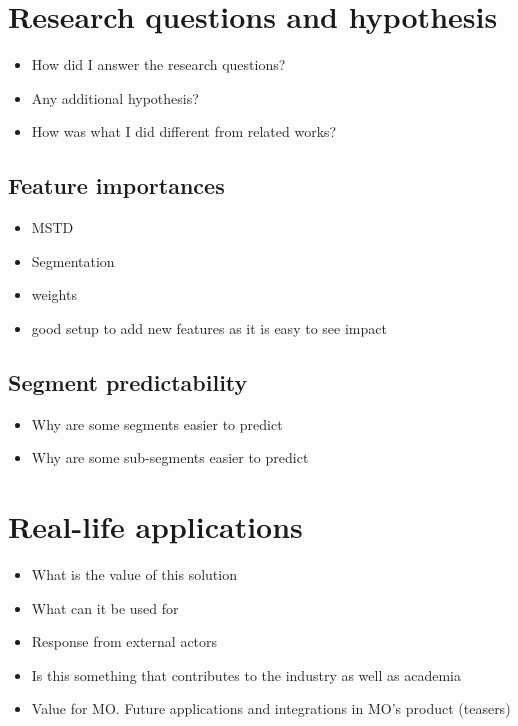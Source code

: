 \section{Research questions and hypothesis}

\begin{itemize}
    \item How did I answer the research questions?
    \item Any additional hypothesis?
    \item How was what I did different from related works?
\end{itemize}

\subsection{Feature importances}

\begin{itemize}
    \item MSTD
    \item Segmentation
    \item weights
    \item good setup to add new features as it is easy to see impact
\end{itemize}


\subsection{Segment predictability}

\begin{itemize}
    \item Why are some segments easier to predict
    \item Why are some sub-segments easier to predict
\end{itemize}

\section{Real-life applications}

\begin{itemize}
    \item What is the value of this solution
    \item What can it be used for
    \item Response from external actors
    \item Is this something that contributes to the industry as well as academia
    \item Value for MO\@. Future applications and integrations in MO's product (teasers)
\end{itemize}


